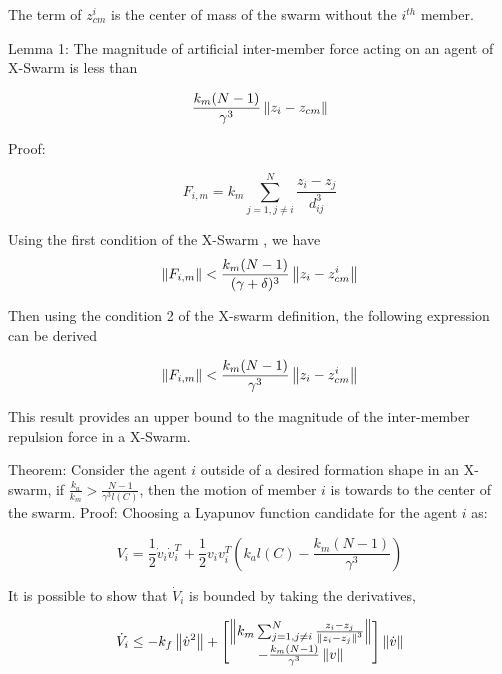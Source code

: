 The term of $z_{cm}^i$ is the center of mass of the swarm without the $i^{th}$ member.

Lemma 1: The magnitude of artificial inter-member force acting on an agent of X-Swarm  is less than

\begin{equation}
\frac{k_m(N-1)}{\gamma ^3} \left\lVert z_i - z_{cm}\right\rVert
\end{equation}

Proof:

\begin{equation}
F_{i,m} = k_m \sum_{j=1, j \neq i}^{N} \frac{z_i - z_j}{d_{ij}^3} 
\end{equation}

Using the first condition of the X-Swarm , we have
\begin{equation}
\left\lVert F_{i,m}\right\rVert < \frac{k_m(N-1)}{(\gamma + \delta)^3} \left\lVert z_i - z_{cm}^i\right\rVert
\end{equation}

Then using the condition 2 of the X-swarm definition, the following expression can be derived

\begin{equation}
\left\lVert F_{i,m}\right\rVert < \frac{k_m(N-1)}{\gamma^3} \left\lVert z_i - z_{cm}^i\right\rVert
\end{equation}

This result provides an upper bound to the magnitude of the inter-member repulsion force in a X-Swarm.  
		
Theorem: Consider the agent $i$	outside of a desired formation shape in an X-swarm, if $\frac{k_a}{k_m} > \frac{N-1}{\gamma^3  l(C)}$, then the motion of member $i$ is towards to the center of the swarm. \newline
Proof: Choosing a Lyapunov function candidate for the agent $i$ as:

\begin{equation}
V_i = \frac{1}{2} \dot{v}_i \dot{v}_i^T + \frac{1}{2} v_i v_i^T\left(k_al(C)-\frac{k_m(N-1)}{\gamma^3}\right) 
\end{equation}

It is possible to show that $\dot{V}_i$ is bounded by taking the derivatives,
			
\begin{equation}
\dot{V}_i \leq -k_f \left\lVert\dot{v}^2\right\rVert + \begin{bmatrix}
\left\lVert k_m \sum_{j=1, j \neq i}^{N} \frac{z_i - z_j}{\left\lVert z_i - z_j\right\rVert^3}\right\rVert \\
- \frac{k_m(N-1)}{\gamma ^3} \left\lVert v\right\rVert
\end{bmatrix} \left\lVert\dot{v}\right\rVert
\end{equation}
			
